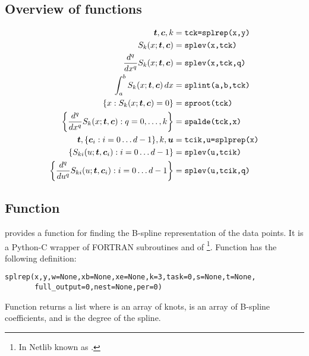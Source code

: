 \subsection{Overview of functions}
\label{sec:fitpack_short}

\newcommand{\Skx}{S_k(x; \vec t, \vec c)}
\begin{displaymath}
  \begin{split}
    \vec t, \vec c, k &=\text{\code{tck=splrep(x,y)}}\\
    \Skx &=\text{\code{splev(x,tck)}}\\
    \nUx q{}x\Skx &=\text{\code{splev(x,tck,q)}}\\
    \int_a^b \Skx\,dx &=\text{\code{splint(a,b,tck)}}\\
    \{x : \Skx=0\}&=\text{\code{sproot(tck)}}\\
    \left\{\nUx q{}x\Skx: q=0,\ldots,k\right\}&=\text{\code{spalde(tck,x)}}\\
    \vec t, \{\vec c_i : i=0\ldots d-1\}, k, \vec u
    &=\text{\code{tcik,u=splprep(x)}}\\ 
    \left\{S_{ki}(u; \vec t, \vec c_i) : i=0\ldots d-1\right\}
    &=\text{\code{splev(u,tcik)}}\\ 
    \left\{\nUx q{}uS_{ki}(u; \vec t, \vec c_i) : i=0\ldots d-1\right\}
    &=\text{\code{splev(u,tcik,q)}}
  \end{split}
\end{displaymath} 

\subsection{Function }
\label{sec:splrep}

 provides a function  for finding the
B-spline representation of the data points. It is a Python-C wrapper
of FORTRAN subroutines  and  of
\footnote{In Netlib known as .}.  Function
 has the following definition:
\begin{verbatim}
splrep(x,y,w=None,xb=None,xe=None,k=3,task=0,s=None,t=None,
       full_output=0,nest=None,per=0)
\end{verbatim}

Function  returns a list \code{[t,c,k]} where  is
an array of knots,  is an array of B-spline coefficients, and
 is the degree of the spline.

